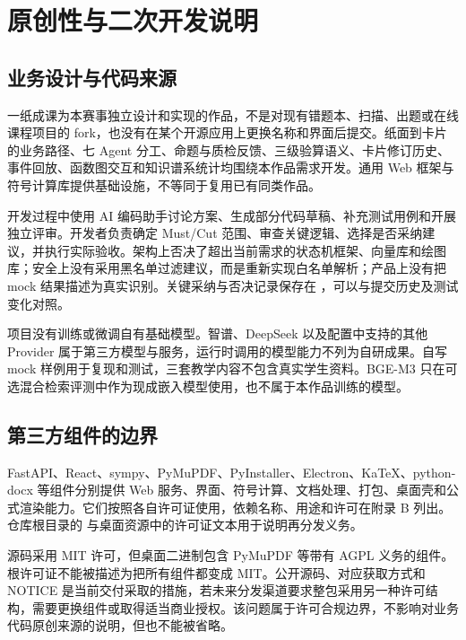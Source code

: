 \section{原创性与二次开发说明}

\subsection{业务设计与代码来源}

一纸成课为本赛事独立设计和实现的作品，不是对现有错题本、扫描、出题或在线课程项目的 fork，也没有在某个开源应用上更换名称和界面后提交。纸面到卡片的业务路径、七 Agent 分工、命题与质检反馈、三级验算语义、卡片修订历史、事件回放、函数图交互和知识谱系统计均围绕本作品需求开发。通用 Web 框架与符号计算库提供基础设施，不等同于复用已有同类作品。

开发过程中使用 AI 编码助手讨论方案、生成部分代码草稿、补充测试用例和开展独立评审。开发者负责确定 Must/Cut 范围、审查关键逻辑、选择是否采纳建议，并执行实际验收。架构上否决了超出当前需求的状态机框架、向量库和绘图库；安全上没有采用黑名单过滤建议，而是重新实现白名单解析；产品上没有把 mock 结果描述为真实识别。关键采纳与否决记录保存在 ，可以与提交历史及测试变化对照。

项目没有训练或微调自有基础模型。智谱、DeepSeek 以及配置中支持的其他 Provider 属于第三方模型与服务，运行时调用的模型能力不列为自研成果。自写 mock 样例用于复现和测试，三套教学内容不包含真实学生资料。BGE-M3 只在可选混合检索评测中作为现成嵌入模型使用，也不属于本作品训练的模型。

\subsection{第三方组件的边界}

FastAPI、React、sympy、PyMuPDF、PyInstaller、Electron、KaTeX、python-docx 等组件分别提供 Web 服务、界面、符号计算、文档处理、打包、桌面壳和公式渲染能力。它们按照各自许可证使用，依赖名称、用途和许可在附录 B 列出。仓库根目录的  与桌面资源中的许可证文本用于说明再分发义务。

源码采用 MIT 许可，但桌面二进制包含 PyMuPDF 等带有 AGPL 义务的组件。根许可证不能被描述为把所有组件都变成 MIT。公开源码、对应获取方式和 NOTICE 是当前交付采取的措施，若未来分发渠道要求整包采用另一种许可结构，需要更换组件或取得适当商业授权。该问题属于许可合规边界，不影响对业务代码原创来源的说明，但也不能被省略。

